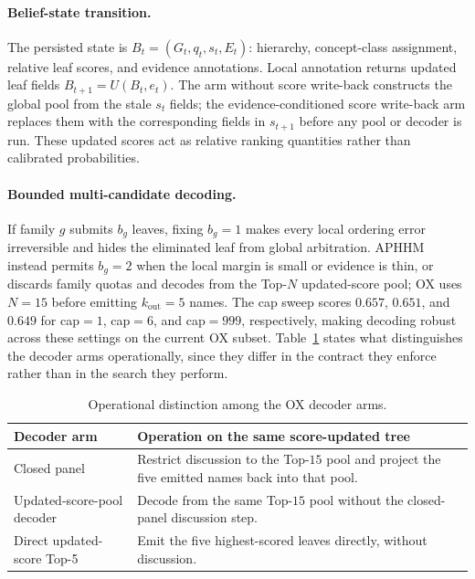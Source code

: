 \documentclass[letterpaper]{article}
\begin{document}
\paragraph{Belief-state transition.}
The persisted state is $B_t=(G_t,q_t,s_t,E_t)$: hierarchy, concept-class assignment, relative leaf scores, and evidence annotations.
Local annotation returns updated leaf fields $B_{t+1}=U(B_t,e_t)$.
The arm without score write-back constructs the global pool from the stale $s_t$ fields; the evidence-conditioned score write-back arm replaces them with the corresponding fields in $s_{t+1}$ before any pool or decoder is run.
These updated scores act as relative ranking quantities rather than calibrated probabilities.

\paragraph{Bounded multi-candidate decoding.}
If family $g$ submits $b_g$ leaves, fixing $b_g{=}1$ makes every local ordering error irreversible and hides the eliminated leaf from global arbitration.
APHHM instead permits $b_g{=}2$ when the local margin is small or evidence is thin, or discards family quotas and decodes from the Top-$N$ updated-score pool; OX uses $N{=}15$ before emitting $k_{\mathrm{out}}{=}5$ names.
The cap sweep scores $0.657$, $0.651$, and $0.649$ for cap${=}1$, cap${=}6$, and cap${=}999$, respectively, making decoding robust across these settings on the current OX subset.
Table~\ref{tab:decoder-contract} states what distinguishes the decoder arms operationally, since they differ in the contract they enforce rather than in the search they perform.

\begin{table}[tb]
\centering
\small
\begin{tabular}{@{}p{2.15cm}p{4.45cm}@{}}
\toprule
Decoder arm & Operation on the same score-updated tree \\
\midrule
Closed panel & Restrict discussion to the Top-$15$ pool and project the five emitted names back into that pool. \\
Updated-score-pool decoder & Decode from the same Top-$15$ pool without the closed-panel discussion step. \\
Direct updated-score Top-5 & Emit the five highest-scored leaves directly, without discussion. \\
\bottomrule
\end{tabular}
\caption{Operational distinction among the OX decoder arms.}
\label{tab:decoder-contract}
\end{table}
\end{document}
